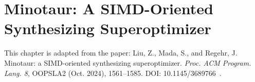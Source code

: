 \chapter{Minotaur: A SIMD-Oriented Synthesizing Superoptimizer}
\label{chap:minotaur}

This chapter is adapted from the paper:
Liu, Z., Mada, S., and Regehr, J. Minotaur: a SIMD-oriented
synthesizing superoptimizer. \textit{Proc. ACM Program. Lang. 8},
OOPSLA2 (Oct. 2024), 1561–1585. DOI: 10.1145/3689766~\cite{minotaur}.







